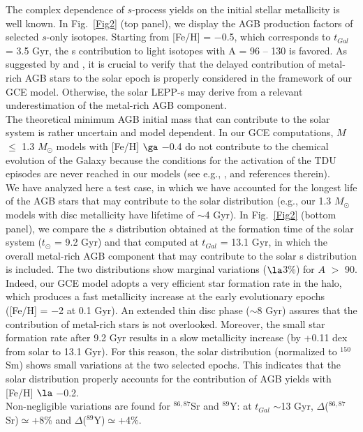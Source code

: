\documentclass[manuscript]{aastex}
\begin{document}
The complex dependence of $s$-process yields on the initial stellar metallicity 
is well known.
In Fig.~\ref{Fig2} (top panel), we display the AGB production factors of selected 
$s$-only isotopes. 
Starting from [Fe/H] = $-$0.5, which corresponds to $t_{Gal}$ = 3.5 Gyr, the 
s contribution to light isotopes with A = 96 -- 130 is favored. 
As suggested by \citet{maiorca12} and \citet{cristallo15},
it is crucial to verify that the delayed contribution of metal-rich AGB stars to the solar 
epoch is properly considered in the framework of our GCE model.
Otherwise, the solar LEPP-s may derive from a relevant underestimation of the 
metal-rich AGB component.
\\
 The theoretical minimum AGB initial mass that can contribute 
to the solar system is rather uncertain and model dependent. In our GCE computations,
$M$ $\le$ 1.3 $M_\odot$ models with [Fe/H] $\ga$ $-$0.4 
do not contribute to the chemical evolution of the Galaxy because 
the conditions for the activation of the TDU episodes are never reached in our models
(see e.g., \citealt{bisterzo14}, and references therein). 
\\
We have analyzed here a test case, in which
we have accounted for the longest life of the AGB stars that may contribute to the solar
distribution (e.g., our 1.3 $M_\odot$ models with disc metallicity 
have lifetime of $\sim$4 Gyr).
In Fig.~\ref{Fig2} (bottom panel), we compare the $s$ distribution obtained at the formation 
time of the solar system ($t_\odot$ = 9.2 Gyr) and that computed at $t_{Gal}$ = 13.1 Gyr,
in which the overall metal-rich AGB component that may contribute to the solar s distribution
is included.
The two distributions show marginal variations ($\la$3\%) for $A$ $>$ 90. 
Indeed, our GCE model adopts a very efficient star formation rate in the halo, which 
produces a fast metallicity increase at the early evolutionary epochs ([Fe/H] = $-$2 at 0.1 
Gyr). An extended thin disc phase ($\sim$8 Gyr) assures that the contribution of metal-rich stars 
is not overlooked. 
Moreover, the small star formation rate after 9.2 Gyr results in a slow metallicity 
increase (by +0.11 dex from solar to 13.1 Gyr). For this reason, the solar distribution 
(normalized to $^{150}$Sm) shows small variations at the two selected epochs.
This indicates that the solar distribution properly accounts for the contribution of AGB 
yields with [Fe/H] $\la$ $-$0.2.
\\
Non-negligible variations are found for $^{86,87}$Sr and
$^{89}$Y: at $t_{Gal}$ $\sim$13 Gyr, $\Delta$($^{86,87}$Sr)$\simeq$+8\% and $\Delta$($^{89}$Y)$\simeq$+4\%.
\end{document}
